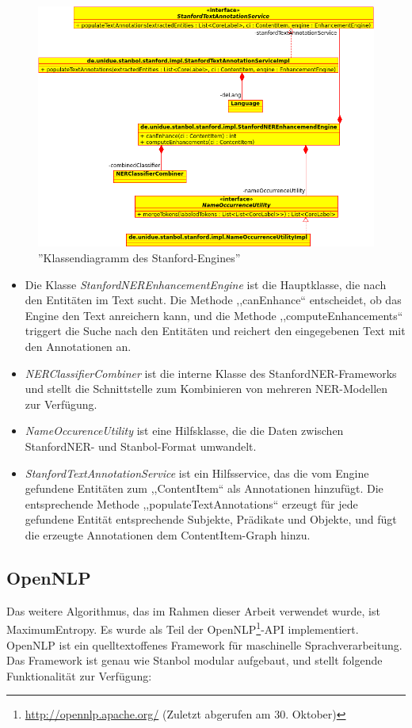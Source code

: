 \begin{figure}[ht]
\centering
\includegraphics[width=\textwidth]{Bilder/stanford-classes.png}
\caption{''Klassendiagramm  des Stanford-Engines''}
\label{fig:stanfclasses}
\end{figure}
\begin{itemize}
\item Die Klasse \textit{StanfordNEREnhancementEngine} ist die Hauptklasse, die nach den Entitäten im Text sucht. Die Methode ,,canEnhance`` entscheidet, ob das Engine den Text anreichern kann, und die Methode ,,computeEnhancements`` triggert die Suche nach den Entitäten und reichert den eingegebenen Text mit den Annotationen an.
\item \textit{NERClassifierCombiner} ist die interne Klasse des StanfordNER-Frameworks und stellt die Schnittstelle zum Kombinieren von mehreren NER-Modellen zur Verfügung.
\item \textit{NameOccurenceUtility} ist eine Hilfsklasse, die die Daten zwischen StanfordNER- und Stanbol-Format umwandelt.
\item \textit{StanfordTextAnnotationService} ist ein Hilfsservice, das die vom Engine gefundene Entitäten zum ,,ContentItem`` als Annotationen hinzufügt. Die entsprechende Methode ,,populateTextAnnotations`` erzeugt für jede gefundene Entität entsprechende Subjekte, Prädikate und Objekte, und fügt die erzeugte Annotationen dem ContentItem-Graph hinzu.
\end{itemize}

\subsection{OpenNLP}
Das weitere Algorithmus, das im Rahmen dieser Arbeit verwendet wurde, ist MaximumEntropy. Es wurde als Teil der OpenNLP\footnote{\url{http://opennlp.apache.org/} (Zuletzt abgerufen am 30. Oktober)}-API implementiert. OpenNLP ist ein quelltextoffenes Framework für maschinelle Sprachverarbeitung. Das Framework ist genau wie Stanbol modular aufgebaut, und stellt folgende Funktionalität zur Verfügung:

